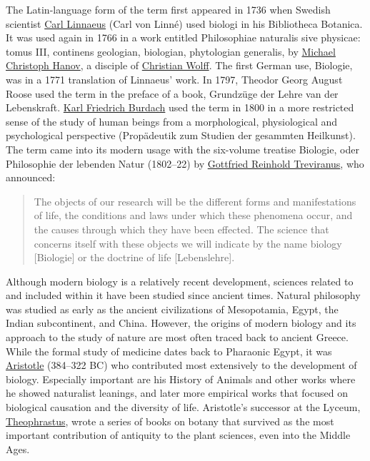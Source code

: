 \documentclass[
]{article}
\begin{document}
The Latin-language form of the term first appeared in 1736 when Swedish
scientist \href{https://en.wikipedia.org/wiki/Carl_Linnaeus}{Carl
Linnaeus} (Carl von Linné) used biologi in his Bibliotheca Botanica. It
was used again in 1766 in a work entitled Philosophiae naturalis sive
physicae: tomus III, continens geologian, biologian, phytologian
generalis, by
\href{https://en.wikipedia.org/wiki/Michael_Christoph_Hanow}{Michael
Christoph Hanov}, a disciple of
\href{https://en.wikipedia.org/wiki/Christian_Wolff_(philosopher)}{Christian
Wolff}. The first German use, Biologie, was in a 1771 translation of
Linnaeus' work. In 1797, Theodor Georg August Roose used the term in the
preface of a book, Grundzüge der Lehre van der Lebenskraft.
\href{https://en.wikipedia.org/wiki/Karl_Friedrich_Burdach}{Karl
Friedrich Burdach} used the term in 1800 in a more restricted sense of
the study of human beings from a morphological, physiological and
psychological perspective (Propädeutik zum Studien der gesammten
Heilkunst). The term came into its modern usage with the six-volume
treatise Biologie, oder Philosophie der lebenden Natur (1802--22) by
\href{https://en.wikipedia.org/wiki/Gottfried_Reinhold_Treviranus}{Gottfried
Reinhold Treviranus}, who announced:

\begin{quote}
The objects of our research will be the different forms and
manifestations of life, the conditions and laws under which these
phenomena occur, and the causes through which they have been effected.
The science that concerns itself with these objects we will indicate by
the name biology {[}Biologie{]} or the doctrine of life
{[}Lebenslehre{]}.
\end{quote}

Although modern biology is a relatively recent development, sciences
related to and included within it have been studied since ancient times.
Natural philosophy was studied as early as the ancient civilizations of
Mesopotamia, Egypt, the Indian subcontinent, and China. However, the
origins of modern biology and its approach to the study of nature are
most often traced back to ancient Greece. While the formal study of
medicine dates back to Pharaonic Egypt, it was
\href{https://en.wikipedia.org/wiki/Aristotle}{Aristotle} (384--322 BC)
who contributed most extensively to the development of biology.
Especially important are his History of Animals and other works where he
showed naturalist leanings, and later more empirical works that focused
on biological causation and the diversity of life. Aristotle's successor
at the Lyceum,
\href{https://en.wikipedia.org/wiki/Theophrastus}{Theophrastus}, wrote a
series of books on botany that survived as the most important
contribution of antiquity to the plant sciences, even into the Middle
Ages.
\end{document}
